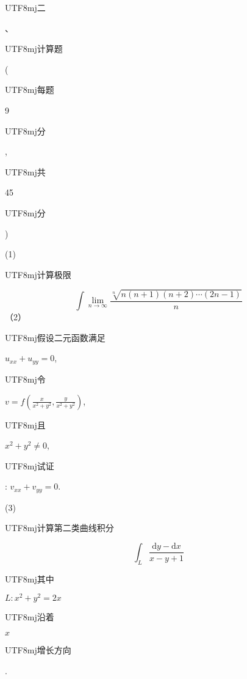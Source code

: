 \documentclass[10pt]{article}
\begin{document}
\begin{CJK}{UTF8}{mj}二\end{CJK}、\begin{CJK}{UTF8}{mj}计算题\end{CJK} (\begin{CJK}{UTF8}{mj}每题\end{CJK} 9 \begin{CJK}{UTF8}{mj}分\end{CJK}, \begin{CJK}{UTF8}{mj}共\end{CJK} 45 \begin{CJK}{UTF8}{mj}分\end{CJK})

(1) \begin{CJK}{UTF8}{mj}计算极限\end{CJK}
$$
\int \lim _{n \rightarrow \infty} \frac{\sqrt[n]{n(n+1)(n+2) \cdots(2 n-1)}}{n}
$$
（2） \begin{CJK}{UTF8}{mj}假设二元函数满足\end{CJK} $u_{x x}+u_{y y}=0$, \begin{CJK}{UTF8}{mj}令\end{CJK} $v=f\left(\frac{x}{x^{2}+y^{2}}, \frac{y}{x^{2}+y^{2}}\right)$, \begin{CJK}{UTF8}{mj}且\end{CJK} $x^{2}+y^{2} \neq 0$, \begin{CJK}{UTF8}{mj}试证\end{CJK}: $v_{x x}+v_{y y}=0$.

(3) \begin{CJK}{UTF8}{mj}计算第二类曲线积分\end{CJK}
$$
\int_{L} \frac{\mathrm{d} y-\mathrm{d} x}{x-y+1}
$$
\begin{CJK}{UTF8}{mj}其中\end{CJK} $L: x^{2}+y^{2}=2 x$ \begin{CJK}{UTF8}{mj}沿着\end{CJK} $x$ \begin{CJK}{UTF8}{mj}增长方向\end{CJK}.
\end{document}
